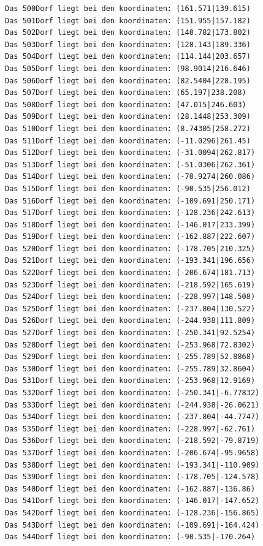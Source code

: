 \documentclass{article}
\begin{document}
\begin{verbatim}
Das 500Dorf liegt bei den koordinaten: (161.571|139.615)
Das 501Dorf liegt bei den koordinaten: (151.955|157.182)
Das 502Dorf liegt bei den koordinaten: (140.782|173.802)
Das 503Dorf liegt bei den koordinaten: (128.143|189.336)
Das 504Dorf liegt bei den koordinaten: (114.144|203.657)
Das 505Dorf liegt bei den koordinaten: (98.9014|216.646)
Das 506Dorf liegt bei den koordinaten: (82.5404|228.195)
Das 507Dorf liegt bei den koordinaten: (65.197|238.208)
Das 508Dorf liegt bei den koordinaten: (47.015|246.603)
Das 509Dorf liegt bei den koordinaten: (28.1448|253.309)
Das 510Dorf liegt bei den koordinaten: (8.74305|258.272)
Das 511Dorf liegt bei den koordinaten: (-11.0296|261.45)
Das 512Dorf liegt bei den koordinaten: (-31.0094|262.817)
Das 513Dorf liegt bei den koordinaten: (-51.0306|262.361)
Das 514Dorf liegt bei den koordinaten: (-70.9274|260.086)
Das 515Dorf liegt bei den koordinaten: (-90.535|256.012)
Das 516Dorf liegt bei den koordinaten: (-109.691|250.171)
Das 517Dorf liegt bei den koordinaten: (-128.236|242.613)
Das 518Dorf liegt bei den koordinaten: (-146.017|233.399)
Das 519Dorf liegt bei den koordinaten: (-162.887|222.607)
Das 520Dorf liegt bei den koordinaten: (-178.705|210.325)
Das 521Dorf liegt bei den koordinaten: (-193.341|196.656)
Das 522Dorf liegt bei den koordinaten: (-206.674|181.713)
Das 523Dorf liegt bei den koordinaten: (-218.592|165.619)
Das 524Dorf liegt bei den koordinaten: (-228.997|148.508)
Das 525Dorf liegt bei den koordinaten: (-237.804|130.522)
Das 526Dorf liegt bei den koordinaten: (-244.938|111.809)
Das 527Dorf liegt bei den koordinaten: (-250.341|92.5254)
Das 528Dorf liegt bei den koordinaten: (-253.968|72.8302)
Das 529Dorf liegt bei den koordinaten: (-255.789|52.8868)
Das 530Dorf liegt bei den koordinaten: (-255.789|32.8604)
Das 531Dorf liegt bei den koordinaten: (-253.968|12.9169)
Das 532Dorf liegt bei den koordinaten: (-250.341|-6.77832)
Das 533Dorf liegt bei den koordinaten: (-244.938|-26.0621)
Das 534Dorf liegt bei den koordinaten: (-237.804|-44.7747)
Das 535Dorf liegt bei den koordinaten: (-228.997|-62.761)
Das 536Dorf liegt bei den koordinaten: (-218.592|-79.8719)
Das 537Dorf liegt bei den koordinaten: (-206.674|-95.9658)
Das 538Dorf liegt bei den koordinaten: (-193.341|-110.909)
Das 539Dorf liegt bei den koordinaten: (-178.705|-124.578)
Das 540Dorf liegt bei den koordinaten: (-162.887|-136.86)
Das 541Dorf liegt bei den koordinaten: (-146.017|-147.652)
Das 542Dorf liegt bei den koordinaten: (-128.236|-156.865)
Das 543Dorf liegt bei den koordinaten: (-109.691|-164.424)
Das 544Dorf liegt bei den koordinaten: (-90.535|-170.264)

\end{verbatim}
\end{document}
